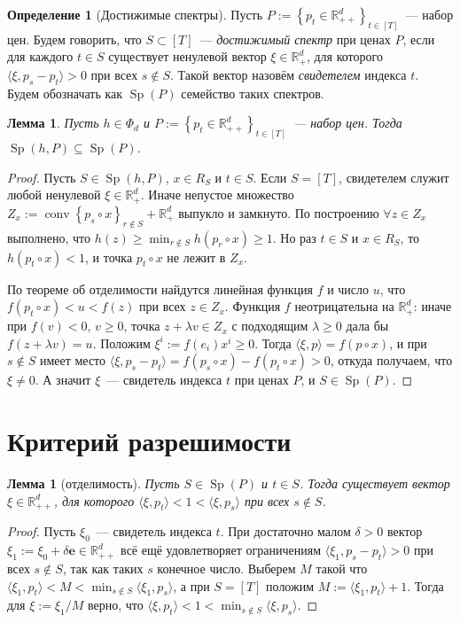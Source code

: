 \documentclass[a4paper,11pt]{article}
\theoremstyle{plain}
\newtheorem{lemma}[theorem]{Лемма}
\theoremstyle{definition}
\newtheorem{definition}[theorem]{Определение}
\theoremstyle{remark}
\newcommand{\R}{\mathbb{R}}
\newcommand{\set}[1]{\left\{ #1 \right\}}
\newcommand{\ip}[2]{\langle #1, #2\rangle} %
\newcommand{\Rpp}[1][2]{\R^{#1}_{++}} %
\newcommand{\Rp}[1][2]{\R^{#1}_{+}}   %
\DeclareMathOperator{\conv}{conv}
\DeclareMathOperator{\Sp}{Sp}
\begin{document}
\begin{definition}[Достижимые спектры]\label{def:reachable}
    Пусть $P:=\set{p_{t}\in\Rpp[d]}_{t\in[T]}$~--- набор цен. Будем говорить, что $S\subset[T]$~--- \textit{достижимый спектр} при ценах $P$, если для каждого $t\in S$ существует ненулевой вектор $\xi\in\Rp[d]$, для которого $\ip{\xi}{p_s-p_t}>0$ при всех $s\notin S$. Такой вектор назовём \textit{свидетелем} индекса $t$. Будем обозначать как $\Sp(P)$ семейство таких спектров.
\end{definition}

\begin{lemma}\label{lem:necessity}
    Пусть $h\in\Phi_{d}$ и $P:=\set{p_{t}\in\Rpp[d]}_{t\in[T]}$~--- набор цен. Тогда $\Sp(h,P)\subseteq\Sp(P)$.
\end{lemma}

\begin{proof}
    Пусть $S\in\Sp(h,P)$, $x\in R_S$ и $t\in S$. Если $S=[T]$, свидетелем служит любой ненулевой $\xi\in\Rp[d]$. Иначе непустое множество $Z_{x}:=\conv\set{p_s\circ x}_{r\notin S}+\Rp[d]$ выпукло и замкнуто. По построению $\forall z\in Z_{x}$ выполнено, что $h(z)\ge\min_{r\notin S}h(p_r\circ x)\geq 1$. Но раз $t\in S$ и $x\in R_S$, то $h(p_t\circ x)<1$, и точка $p_t\circ x$ не лежит в $Z_{x}$.
    
    По теореме об отделимости найдутся линейная функция $f$ и число $u$, что $f(p_t\circ x)<u<f(z)$ при всех $z\in Z_{x}$. Функция $f$ неотрицательна на $\Rp[d]$: иначе при $f(v)<0$, $v\ge0$, точка $z+\lambda v\in Z_{x}$ с подходящим $\lambda\ge0$ дала бы $f(z+\lambda v)=u$. Положим $\xi^i:=f(e_i)x^i\ge0$. Тогда $\ip{\xi}{p}=f(p\circ x)$, и при $s\notin S$ имеет место
    $\ip{\xi}{p_s-p_t}=f(p_s\circ x)-f(p_t\circ x)>0$,
    откуда получаем, что $\xi\ne0$. А значит $\xi$~--- свидетель индекса $t$ при ценах $P$, и $S\in\Sp(P)$.
\end{proof}

\section{Критерий разрешимости}

\begin{lemma}[отделимость]\label{lem:separation}
    Пусть $S\in\Sp(P)$ и $t\in S$. Тогда существует вектор $\xi\in\Rpp[d]$, для которого $\ip{\xi}{p_t}<1<\ip{\xi}{p_s}$ при всех $s\notin S$.
\end{lemma}

\begin{proof}
    Пусть $\xi_0$~--- свидетель индекса $t$. При достаточно малом $\delta>0$ вектор $\xi_1:=\xi_0+\delta\mathbf e\in\Rpp[d]$ всё ещё удовлетворяет ограничениям $\ip{\xi_1}{p_s-p_t}>0$ при всех $s\notin S$, так как таких $s$ конечное число. Выберем $M$ такой что $\ip{\xi_1}{p_t}<M<\min_{s\notin S}\ip{\xi_1}{p_s}$, а при $S=[T]$ положим $M:=\ip{\xi_1}{p_t}+1$. Тогда для $\xi:=\xi_1/M$ верно, что $\ip{\xi}{p_t}<1<\min_{s\notin S}\ip{\xi}{p_s}$.
\end{proof}
\end{document}
